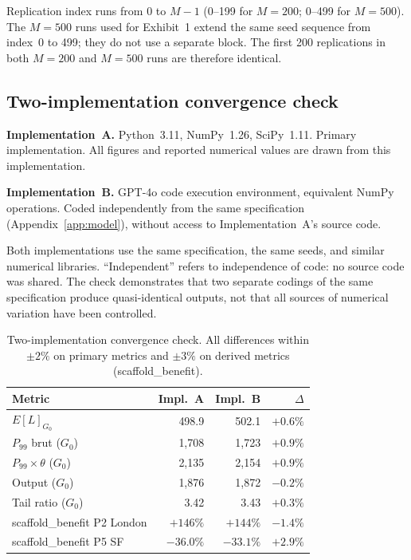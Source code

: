 \documentclass[11pt,a4paper]{article}
\begin{document}
\begin{appendices}
Replication index runs from 0 to $M{-}1$ (0--199 for $M = 200$; 0--499 for
$M = 500$). The $M = 500$ runs used for Exhibit~1 extend the same seed
sequence from index~0 to 499; they do not use a separate block. The first
200 replications in both $M = 200$ and $M = 500$ runs are therefore
identical.

\subsection{Two-implementation convergence
check}\label{app:repro:convergence}

\textbf{Implementation~A.}
Python~3.11, NumPy~1.26, SciPy~1.11. Primary implementation. All figures
and reported numerical values are drawn from this implementation.

\textbf{Implementation~B.}
GPT-4o code execution environment, equivalent NumPy operations. Coded
independently from the same specification (Appendix~\ref{app:model}),
without access to Implementation~A's source code.

Both implementations use the same specification, the same seeds, and similar
numerical libraries. ``Independent'' refers to independence of code: no
source code was shared. The check demonstrates that two separate codings of
the same specification produce quasi-identical outputs, not that all sources
of numerical variation have been controlled.

\begin{table}[H]
\centering\small
\setlength{\tabcolsep}{6pt}
\renewcommand{\arraystretch}{1.20}
\begin{tabular}{@{}l r r r@{}}
\toprule
\textbf{Metric} &
\textbf{Impl.~A} &
\textbf{Impl.~B} &
\textbf{$\Delta$} \\
\midrule
$E[L]_{G_0}$                       & 498.9 & 502.1 & $+0.6\%$ \\
$P_{99}$ brut ($G_0$)              & 1,708 & 1,723 & $+0.9\%$ \\
$P_{99}\times\theta$ ($G_0$)       & 2,135 & 2,154 & $+0.9\%$ \\
Output ($G_0$)                     & 1,876 & 1,872 & $-0.2\%$ \\
Tail ratio ($G_0$)                 & 3.42  & 3.43  & $+0.3\%$ \\
scaffold\_benefit P2 London        & $+146\%$ & $+144\%$ & $-1.4\%$ \\
scaffold\_benefit P5 SF            & $-36.0\%$ & $-33.1\%$ & $+2.9\%$ \\
\bottomrule
\end{tabular}
\caption{Two-implementation convergence check. All differences within
$\pm 2\%$ on primary metrics and $\pm 3\%$ on derived metrics
(scaffold\_benefit).}
\label{tab:convergence}
\end{table}


\end{appendices}
\end{document}
